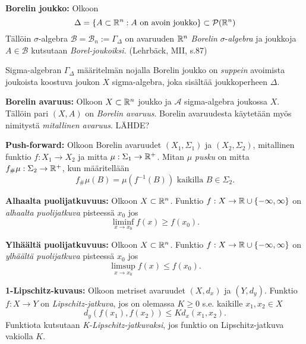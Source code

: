 \begin{definition}
    \textbf{Borelin joukko:}
    Olkoon
    \[\Delta = \{A \subset \mathbb{R}^n : A \text{ on avoin joukko}\} \subset \mathcal{P}(\mathbb{R}^n) \]
    Tällöin $\sigma$-algebra $\mathcal B = \mathcal B_n := \Gamma_\Delta$ on avaruuden $\mathbb{R}^n$ \textit{Borelin} $\sigma$-\textit{algebra} ja joukkoja $A\in \mathcal B$ kutsutaan \textit{Borel-joukoiksi.} 
    (Lehrbäck, MII, s.87)
\end{definition}

Sigma-algebran $\Gamma_\Delta$ määritelmän nojalla Borelin joukko on \textit{suppein} avoimista joukoista koostuva joukon $X$ sigma-algebra, joka sisältää joukkoperheen $\Delta$.



\begin{definition}
    \textbf{Borelin avaruus:} Olkoon $X\subset \mathbb{R}^n$ joukko ja $\mathcal A$ sigma-algebra joukossa $X$. Tällöin pari $(X, A)$ on \textit{Borelin avaruus}. Borelin avaruudesta käytetään myös nimitystä \textit{mitallinen avaruus}. LÄHDE?
\end{definition}

\begin{definition}
    \textbf{Push-forward:} Olkoon Borelin avaruudet $(X_1, \Sigma_1)$ ja $(X_2, \Sigma_2)$, mitallinen funktio $f:X_1 \to X_2$ ja mitta $\mu: \Sigma_1 \to \mathbb{R}^+$. Mitan $\mu$ \textit{pusku} on mitta $f_\#\mu: \Sigma_2 \to \mathbb{R}^+$, kun määritellään
    $$f_\# \mu (B) = \mu(f^{-1}(B)) \text{ kaikilla } B\in \Sigma_2.$$
\end{definition}

\begin{definition}
    \textbf{Alhaalta puolijatkuvuus:} Olkoon $X\subset \mathbb{R}^n$. Funktio $f: X \to \mathbb{R} \cup\{-\infty, \infty\}$ on \textit{alhaalta puolijatkuva} pisteessä $x_0$ jos 
    $$\liminf_{x\to x_0}  f(x) \ge f(x_0).$$
\end{definition}

\begin{definition}
    \textbf{Ylhäältä puolijatkuvuus:} Olkoon $X\subset \mathbb{R}^n$. Funktio $f: X \to \mathbb{R} \cup\{-\infty, \infty\}$ on \textit{ylhäältä puolijatkuva} pisteessä $x_0$ jos 
    $$\limsup_{x\to x_0}  f(x) \le f(x_0).$$
\end{definition}

\begin{definition}
    \textbf{1-Lipschitz-kuvaus:} Olkoon metriset avaruudet $(X, d_x)$ ja $(Y, d_y)$. Funktio $f:X\to Y$ on \textit{Lipschitz-jatkuva}, jos on olemassa $K\ge 0$ s.e. kaikille $x_1,x_2 \in X$
    $$d_y(f(x_1),f(x_2)) \le Kd_x(x_1,x_2).$$
    Funktiota kutsutaan \textit{K-Lipschitz-jatkuvaksi}, jos funktio on Lipschitz-jatkuva vakiolla $K$.
\end{definition}

